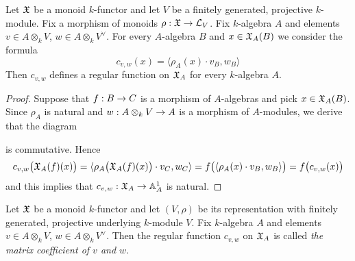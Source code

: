 \begin{proposition}\label{proposition:matrixcoefficients}
Let ${\mathfrak X}$ be a monoid $k$-functor and let $V$ be a finitely generated, projective $k$-module. Fix a morphism of monoids $\rho:{\mathfrak X} \rightarrow {\mathcal L}_V$. Fix $k$-algebra $A$ and elements $v\in A\otimes_kV$, $w\in A\otimes_kV^{\vee}$. For every $A$-algebra $B$ and $x\in {\mathfrak X}_A(B)$ we consider the formula
$$c_{v,w}(x) = \langle \rho_A(x) \cdot v_B, w_B \rangle$$
Then $c_{v,w}$ defines a regular function on ${\mathfrak X}_A$ for every $k$-algebra $A$.
\end{proposition}
\begin{proof}
Suppose that $f:B\rightarrow C$ is a morphism of $A$-algebras and pick $x\in {\mathfrak X}_A(B)$. Since $\rho_A$ is natural and $w:A\otimes_kV\rightarrow A$ is a morphism of $A$-modules, we derive that the diagram
\begin{center}
\end{center}
is commutative. Hence 
$$c_{v,w}\big({\mathfrak X}_A(f)(x)\big)=\langle \rho_A\big({\mathfrak X}_A(f)(x)\big)\cdot v_C,w_C\rangle=f\big(\langle \rho_A(x)\cdot v_B, w_B\rangle \big)=f\big(c_{v,w}(x)\big)$$
and this implies that $c_{v,w}:{\mathfrak X}_A\rightarrow \mathbb{A}^1_A$ is natural.
\end{proof}

\begin{definition}
Let ${\mathfrak X}$ be a monoid $k$-functor and let $(V,\rho)$ be its representation with finitely generated, projective underlying $k$-module $V$. Fix $k$-algebra $A$ and elements $v\in A\otimes_kV$, $w\in A\otimes_kV^{\vee}$. Then the regular function $c_{v,w}$ on ${\mathfrak X}_A$ is called \textit{the matrix coefficient of $v$ and $w$}.
\end{definition}

